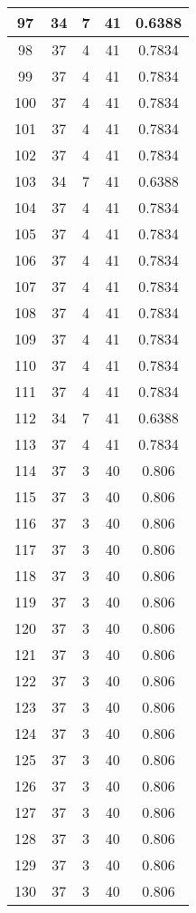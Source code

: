 \documentclass[letterpaper, 12pt]{article}
\begin{document}
\begin{longtable}{|c|c|c|c|c|}
\hline
97 & 34 & 7 & 41 & 0.6388 \\
\hline
98 & 37 & 4 & 41 & 0.7834 \\
\hline
99 & 37 & 4 & 41 & 0.7834 \\
\hline
100 & 37 & 4 & 41 & 0.7834 \\
\hline
101 & 37 & 4 & 41 & 0.7834 \\
\hline
102 & 37 & 4 & 41 & 0.7834 \\
\hline
103 & 34 & 7 & 41 & 0.6388 \\
\hline
104 & 37 & 4 & 41 & 0.7834 \\
\hline
105 & 37 & 4 & 41 & 0.7834 \\
\hline
106 & 37 & 4 & 41 & 0.7834 \\
\hline
107 & 37 & 4 & 41 & 0.7834 \\
\hline
108 & 37 & 4 & 41 & 0.7834 \\
\hline
109 & 37 & 4 & 41 & 0.7834 \\
\hline
110 & 37 & 4 & 41 & 0.7834 \\
\hline
111 & 37 & 4 & 41 & 0.7834 \\
\hline
112 & 34 & 7 & 41 & 0.6388 \\
\hline
113 & 37 & 4 & 41 & 0.7834 \\
\hline
114 & 37 & 3 & 40 & 0.806 \\
\hline
115 & 37 & 3 & 40 & 0.806 \\
\hline
116 & 37 & 3 & 40 & 0.806 \\
\hline
117 & 37 & 3 & 40 & 0.806 \\
\hline
118 & 37 & 3 & 40 & 0.806 \\
\hline
119 & 37 & 3 & 40 & 0.806 \\
\hline
120 & 37 & 3 & 40 & 0.806 \\
\hline
121 & 37 & 3 & 40 & 0.806 \\
\hline
122 & 37 & 3 & 40 & 0.806 \\
\hline
123 & 37 & 3 & 40 & 0.806 \\
\hline
124 & 37 & 3 & 40 & 0.806 \\
\hline
125 & 37 & 3 & 40 & 0.806 \\
\hline
126 & 37 & 3 & 40 & 0.806 \\
\hline
127 & 37 & 3 & 40 & 0.806 \\
\hline
128 & 37 & 3 & 40 & 0.806 \\
\hline
129 & 37 & 3 & 40 & 0.806 \\
\hline
130 & 37 & 3 & 40 & 0.806 \\
\hline

\end{longtable}
\end{document}
